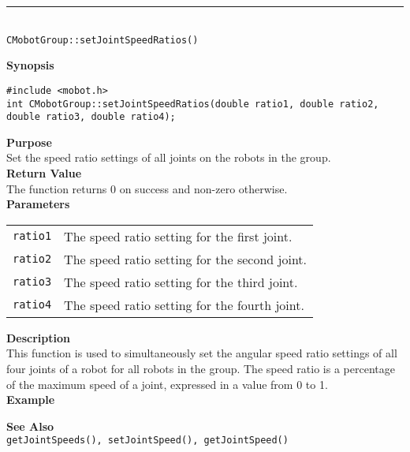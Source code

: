 \noindent
\vspace{5pt}
\rule{4.5in}{0.015in}\\
\noindent
{\LARGE \texttt{CMobotGroup::setJointSpeedRatios()}}\\
{}

\noindent
{\bf Synopsis}
\vspace{-8pt}
\begin{verbatim}
#include <mobot.h>
int CMobotGroup::setJointSpeedRatios(double ratio1, double ratio2, double ratio3, double ratio4);
\end{verbatim}

\noindent
{\bf Purpose}\\
Set the speed ratio settings of all joints on the robots in the group.\\

\noindent
{\bf Return Value}\\
The function returns 0 on success and non-zero otherwise.\\

\noindent
{\bf Parameters}
\vspace{-0.1in}
\begin{description}
\item               
\begin{tabular}{p{10 mm}p{145 mm}}
\texttt{ratio1} & The speed ratio setting for the first joint. \\
\texttt{ratio2} & The speed ratio setting for the second joint. \\
\texttt{ratio3} & The speed ratio setting for the third joint. \\
\texttt{ratio4} & The speed ratio setting for the fourth joint. \\
\end{tabular}
\end{description}

\noindent
{\bf Description}\\
This function is used to simultaneously set the angular speed ratio settings of
all four joints of a robot for all robots in the group. The speed ratio is a percentage of the maximum
speed of a joint, expressed in a value from 0 to 1.\\

\noindent
{\bf Example}\\
\noindent

\noindent
{\bf See Also}\\
\texttt{getJointSpeeds(), setJointSpeed(), getJointSpeed()}

